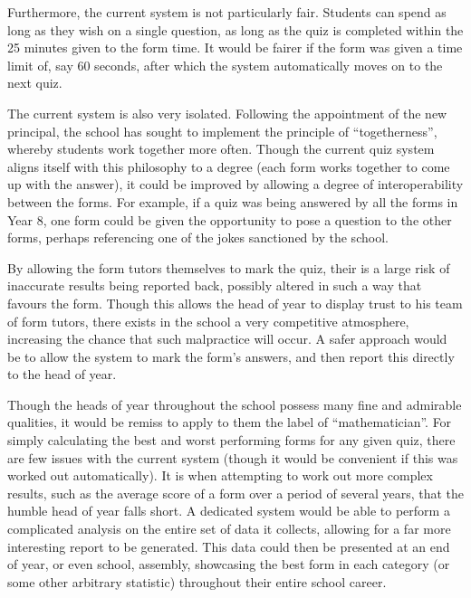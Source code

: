 Furthermore, the current system is not particularly fair. Students can spend as long as they wish on a single question, as long as the quiz is completed within the 25 minutes given to the form time. It would be fairer if the form was given a time limit of, say 60 seconds, after which the system automatically moves on to the next quiz.

The current system is also very isolated. Following the appointment of the new principal, the school has sought to implement the principle of ``togetherness'', whereby students work together more often. Though the current quiz system aligns itself with this philosophy to a degree (each form works together to come up with the answer), it could be improved by allowing a degree of interoperability between the forms. For example, if a quiz was being answered by all the forms in Year 8, one form could be given the opportunity to pose a question to the other forms, perhaps referencing one of the jokes sanctioned by the school.

By allowing the form tutors themselves to mark the quiz, their is a large risk of
inaccurate results being reported back, possibly altered in such a way that favours the form. Though this allows the head of year to display trust to his team of form tutors, there exists in the school a very competitive atmosphere, increasing the chance that such malpractice will occur. A safer approach would be to allow the system to mark the form's answers, and then report this directly to the head of year.

Though the heads of year throughout the school possess many fine and admirable qualities, it would be remiss to apply to them the label of ``mathematician''.  For simply calculating the best and worst performing forms for any given quiz, there are few issues with the current system (though it would be convenient if this was worked out automatically). It is when attempting to work out more complex results, such as the average score of a form over a period of several years, that the humble head of year falls short. A dedicated system would be able to perform a complicated analysis on the entire set of data it collects, allowing for a far more interesting report to be generated. This data could then be presented at an end of year, or even school, assembly, showcasing the best form in each category (or some other arbitrary statistic) throughout their entire school career.
